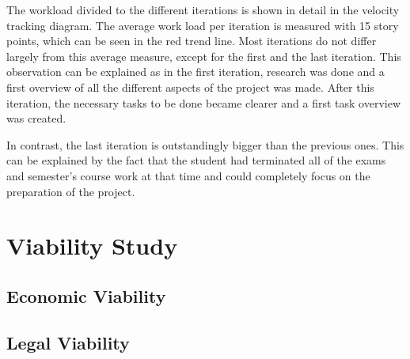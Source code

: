 
The workload divided to the different iterations is shown in detail in the velocity tracking diagram. The average work load per iteration is measured with 15 story points, which can be seen in the red trend line. Most iterations do not differ largely from this average measure, except for the first and the last iteration. This observation can be explained as in the first iteration, research was done and a first overview of all the different aspects of the project was made. After this iteration, the necessary tasks to be done became clearer and a first task overview was created.

In contrast, the last iteration is outstandingly bigger than the previous ones. This can be explained by the fact that the student had terminated all of the exams and semester’s course work at that time and could completely focus on the preparation of the project.


\section{Viability Study}

\subsection{Economic Viability}

\subsection{Legal Viability}


